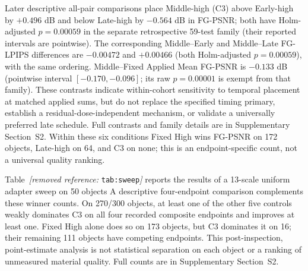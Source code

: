 \documentclass[times,twocolumn,final]{elsarticle}
\providecommand{\DIFadd}[1]{{\protect\color{blue} \sf #1}} %
\providecommand{\DIFdel}[1]{{\protect\color{red} \scriptsize #1}} %
\providecommand{\DIFaddbegin}{} %
\providecommand{\DIFaddend}{} %
\providecommand{\DIFdelbegin}{} %
\providecommand{\DIFdelend}{} %
\begin{document}
\DIFdelbegin %
\DIFdelend \DIFaddbegin \DIFadd{Later descriptive all-pair comparisons place Middle-high (C3) above Early-high by $+0.496$ dB and below Late-high by $-0.564$ dB in FG-PSNR; both have Holm-adjusted $p=0.00059$ in the separate retrospective 59-test family (their reported intervals are pointwise). The corresponding Middle--Early and Middle--Late FG-LPIPS differences are $-0.00472$ and $+0.00466$ (both Holm-adjusted $p=0.00059$), with the same ordering. Middle--Fixed Applied Mean FG-PSNR is $-0.133$ dB (pointwise interval $[-0.170,-0.096]$; its raw $p=0.00001$ is exempt from that family). These contrasts indicate within-cohort sensitivity to temporal placement at matched applied sums, but do not replace the specified timing primary, establish a residual-dose-independent mechanism, or validate a universally preferred late schedule. Full contrasts and family details are in Supplementary Section~S2. Within these six conditions Fixed High wins FG-PSNR on 172 objects, Late-high on 64, and C3 on none; this is an endpoint-specific count, not a universal quality ranking.
}\DIFaddend

\DIFdelbegin \DIFdel{Table~\textit{[removed reference: }\texttt{tab:sweep}\textit{]} reports the results of a 13-scale uniform adapter sweep on 50 objects}\DIFdelend \DIFaddbegin \DIFadd{A descriptive four-endpoint comparison complements these winner counts. On 270/300 objects, at least one of the other five controls weakly dominates C3 on all four recorded composite endpoints and improves at least one. Fixed High alone does so on 173 objects, but C3 dominates it on 16; their remaining 111 objects have competing endpoints. This post-inspection, point-estimate analysis is not statistical separation on each object or a ranking of unmeasured material quality. Full counts are in Supplementary Section~S2}\DIFaddend .
\end{document}
